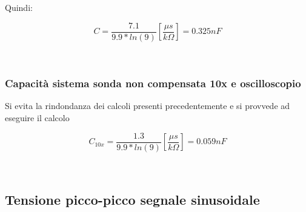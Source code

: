 \documentclass[a4paper]{article}
\begin{document}
Quindi:
\begin{Large}
	\begin{equation}
  		C= \frac{7.1}{9.9*ln(9)} [\frac{\mu s}{k\Omega}]= 0.325nF
	\end{equation}
\end{Large}\\

\subsubsection{Capacità sistema sonda non compensata 10x e oscilloscopio }
Si evita la rindondanza dei calcoli presenti precedentemente e si provvede ad eseguire il calcolo
\begin{Large}
	\begin{equation}
  		C_{10x}= \frac{1.3}{9.9*ln(9)} [\frac{\mu s}{k\Omega}]= 0.059nF
	\end{equation}
\end{Large}\\

\subsection{Tensione picco-picco segnale sinusoidale} %
\end{document}
